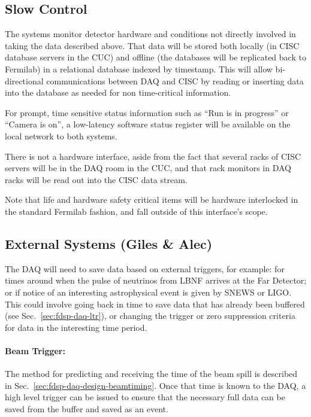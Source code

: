 \subsection{Slow Control}
\label{sec:fdsp-daq-intfc-ext}

The  systems monitor detector
hardware and conditions not directly involved in taking the data
described above.  That data will be stored both locally (in CISC
database servers in the CUC) and offline (the databases will be
replicated back to Fermilab) in a relational database indexed by
timestamp.  This will allow bi-directional communications between DAQ
and CISC by reading or inserting data into the database as needed for
non time-critical information.  

For prompt, time sensitive status information such as ``Run is in
progress'' or ``Camera is on'', a low-latency software status register
will be available on the local network to both systems.

There is not a hardware interface, aside from the fact that several
racks of CISC servers will be in the DAQ room in the CUC, and that rack
monitors in DAQ racks will be read out into the CISC data stream.

Note that life and hardware safety critical items will be hardware
interlocked in the standard Fermilab fashion, and fall outside of this
interface's scope.


\subsection{External Systems (Giles \& Alec)}
\label{sec:fdsp-daq-intfc-ext}


The DAQ will need to save data based on external triggers, for example:
for times around when the pulse of neutrinos from LBNF arrives at the
Far Detector; or if notice of an interesting astrophysical event is
given by SNEWS\cite{snews} or LIGO.  This could involve going back in
time to save data that has already been buffered (see
Sec.~\ref{sec:fdsp-daq-ltr}), or changing the trigger or zero
suppression criteria for data in the interesting time period.


\paragraph{Beam Trigger:} The method for predicting and receiving the
time of the beam spill is described in
Sec.~\ref{sec:fdsp-daq-design-beamtiming}.  Once that time is known to
the DAQ, a high level trigger can be issued to ensure that the necessary
full data can be saved from the buffer and saved as an event.

